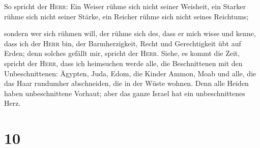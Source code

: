  So spricht der \textsc{Herr}: Ein Weiser rühme sich
nicht seiner Weisheit, ein Starker rühme sich nicht seiner Stärke, ein
Reicher rühme sich nicht seines Reichtums;

 sondern wer sich rühmen will, der rühme sich des, dass
er mich wisse und kenne, dass ich der \textsc{Herr} bin, der
Barmherzigkeit, Recht und Gerechtigkeit übt auf Erden; denn solches
gefällt mir, spricht der \textsc{Herr}.  Siehe, es kommt
die Zeit, spricht der \textsc{Herr}, dass ich heimsuchen werde alle, die
Beschnittenen mit den Unbeschnittenen:  Ägypten, Juda,
Edom, die Kinder Ammon, Moab und alle, die das Haar rundumher
abschneiden, die in der Wüste wohnen. Denn alle Heiden haben
unbeschnittene Vorhaut; aber das ganze Israel hat ein unbeschnittenes
Herz.

\hypertarget{section-9}{%
\section{10}\label{section-9}}

